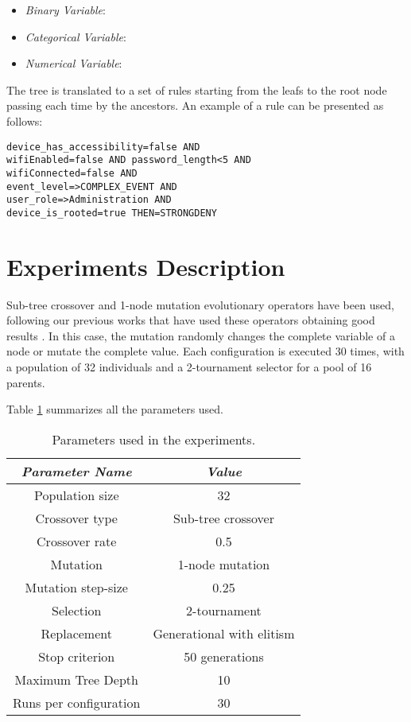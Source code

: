 \documentclass[a4paper,10pt,twocolumn,preprint,3p]{elsarticle}
\begin{document}
\begin{itemize}
\item {\em Binary Variable}: %
\item {\em Categorical Variable}:
\item {\em Numerical Variable}:

\end{itemize}

The tree is translated to a set of rules starting from the leafs to the root node passing each time by the ancestors. An example of a rule can be presented as follows:

\begin{verbatim}
device_has_accessibility=false AND
wifiEnabled=false AND password_length<5 AND
wifiConnected=false AND
event_level=>COMPLEX_EVENT AND
user_role=>Administration AND
device_is_rooted=true THEN=STRONGDENY
\end{verbatim}


\section{Experiments Description}
\label{sec:experiments}

Sub-tree crossover and 1-node mutation evolutionary operators have been used, following our previous works that have used these operators obtaining good results \cite{CITAR_AQUI_EVOSTAR14GPBOT}. In this case, the mutation randomly changes the complete variable of a node or mutate the complete value. Each configuration is executed 30 times, with a population of 32 individuals and a 2-tournament selector for a pool of 16 parents.


Table \ref{tab:parameters} summarizes all the parameters used.

\begin{table}
\begin{center}
\begin{tabular}{|c|c|}
\hline
{\em Parameter Name} & {\em Value} \\\hline
Population size & 32 \\\hline
Crossover type & Sub-tree crossover \\ \hline
Crossover rate & 0.5\\ \hline
Mutation  & 1-node mutation\\ \hline
Mutation step-size & 0.25 \\ \hline
Selection & 2-tournament \\ \hline
Replacement & Generational with elitism\\ \hline
Stop criterion & 50 generations \\ \hline
Maximum Tree Depth & 10 \\ \hline %
Runs per configuration & 30 \\ \hline
\end{tabular}
\caption{Parameters used in the experiments.}
\label{tab:parameters}
\end{center}
\end{table}
\end{document}
